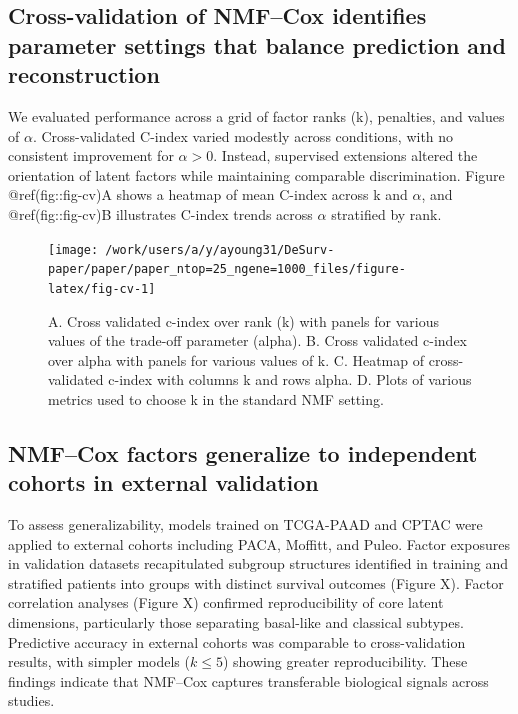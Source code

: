 \documentclass[9pt,twocolumn,twoside,]{pnas-new}
\begin{document}
\subsection{Cross-validation of NMF--Cox identifies parameter settings
that balance prediction and
reconstruction}\label{cross-validation-of-nmfcox-identifies-parameter-settings-that-balance-prediction-and-reconstruction}

We evaluated performance across a grid of factor ranks (k), penalties,
and values of \(\alpha\). Cross-validated C-index varied modestly across
conditions, with no consistent improvement for \(\alpha>0\). Instead,
supervised extensions altered the orientation of latent factors while
maintaining comparable discrimination. Figure @ref(fig::fig-cv)A shows a
heatmap of mean C-index across k and \(\alpha\), and @ref(fig::fig-cv)B
illustrates C-index trends across \(\alpha\) stratified by rank.

\begin{figure}[t]

{\centering \texttt{[image: /work/users/a/y/ayoung31/DeSurv-paper/paper/paper\_ntop=25\_ngene=1000\_files/figure-latex/fig-cv-1]} 

}

\caption{A. Cross validated c-index over rank (k) with panels for various values of the trade-off parameter (alpha). B. Cross validated c-index over alpha with panels for various values of k. C. Heatmap of cross-validated c-index with columns k and rows alpha. D. Plots of various metrics used to choose k in the standard NMF setting.}\label{fig:fig-cv}
\end{figure}

\subsection{NMF--Cox factors generalize to independent cohorts in
external
validation}\label{nmfcox-factors-generalize-to-independent-cohorts-in-external-validation}

To assess generalizability, models trained on TCGA-PAAD and CPTAC were
applied to external cohorts including PACA, Moffitt, and Puleo. Factor
exposures in validation datasets recapitulated subgroup structures
identified in training and stratified patients into groups with distinct
survival outcomes (Figure X). Factor correlation analyses (Figure X)
confirmed reproducibility of core latent dimensions, particularly those
separating basal-like and classical subtypes. Predictive accuracy in
external cohorts was comparable to cross-validation results, with
simpler models (\(k\leq 5\)) showing greater reproducibility. These
findings indicate that NMF--Cox captures transferable biological signals
across studies.
\end{document}
